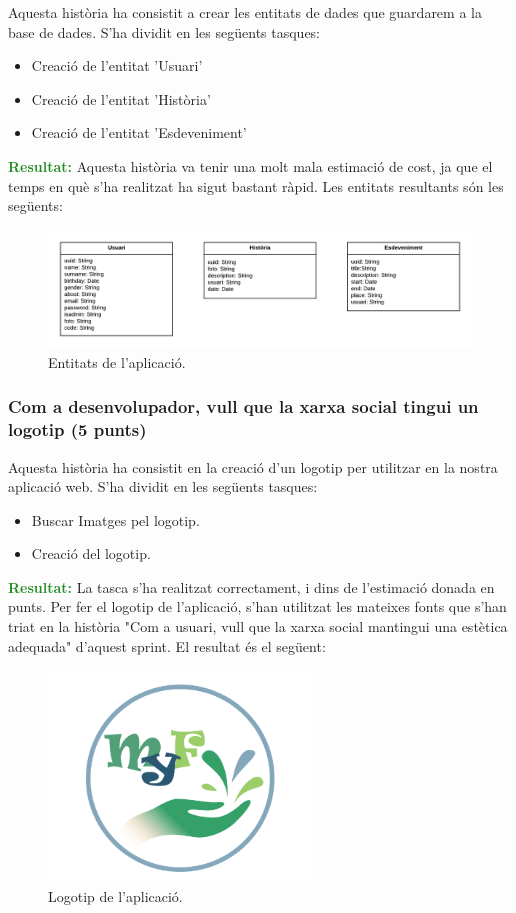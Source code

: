 \documentclass[11pt,catalan,listoffigures,listoftables]{tfgetsinf}
\begin{document}
Aquesta història ha consistit a crear les entitats de dades que guardarem a la base de dades. S'ha dividit en les següents tasques:
\begin{itemize}
\item Creació de l'entitat 'Usuari'
\item Creació de l'entitat 'Història'
\item Creació de l'entitat 'Esdeveniment'
\end{itemize}
\textcolor{forestgreen}{\textbf{Resultat:}} Aquesta història va tenir una molt mala estimació de cost, ja que el temps en què s'ha realitzat ha sigut bastant ràpid. Les entitats resultants són les següents:

\begin{figure}[h]
\includegraphics[width=15cm]{images/image6}
\centering
\caption[Figura 3.2]{Entitats de l'aplicació.}
\centering
\end{figure}

\subsubsection{Com a desenvolupador, vull que la xarxa social tingui un logotip (5 punts)}

Aquesta història ha consistit en la creació d'un logotip per utilitzar en la nostra aplicació web. S'ha dividit en les següents tasques:
\begin{itemize}
\item Buscar Imatges pel logotip.
\item Creació del logotip.
\end{itemize}
\textcolor{forestgreen}{\textbf{Resultat:}} La tasca s'ha realitzat correctament, i dins de l'estimació donada en punts. Per fer el logotip de l'aplicació, s'han utilitzat les mateixes fonts que s'han triat en la història "Com a usuari, vull que la xarxa social mantingui una estètica adequada" d'aquest sprint.
El resultat és el següent:

\begin{figure}[H]
\includegraphics[width=7cm]{images/image3}
\centering
\caption[Figura 3.3]{Logotip de l'aplicació.}
\centering
\end{figure}
\end{document}
